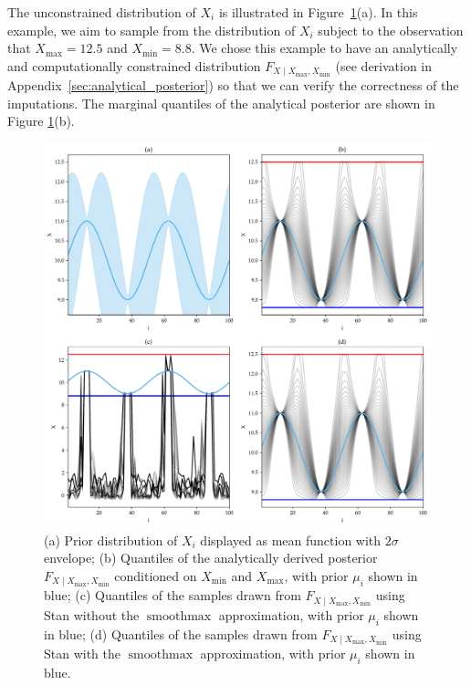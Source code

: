 \documentclass[letter]{article}
\makeatletter
\def\maxwidth{\ifdim\Gin@nat@width>\linewidth\linewidth
\else\Gin@nat@width\fi}
\let\Oldincludegraphics\includegraphics
\renewcommand{\includegraphics}[1]{\Oldincludegraphics[width=0.98\maxwidth]{#1}}
\DeclareMathOperator*{\softmax}{smoothmax}
\newcommand{\Xmax}{X_{\max}}
\newcommand{\Xmin}{X_{\min}}
\newcommand{\Fcond}{F_{X \mid \Xmax,\Xmin}}
\makeatother
\begin{document}
The unconstrained distribution of \(X_i\) is illustrated in Figure~\ref{fig:toy_quantiles}(a).
In this example, we aim to sample from the distribution of \(X_i\) subject to the observation that \(\Xmax=12.5\) and \(\Xmin=8.8\).
We chose this example to have an analytically and computationally constrained distribution \(\Fcond\) (see derivation in Appendix~\ref{sec:analytical_posterior}) so that we can verify the correctness of the imputations.
The marginal quantiles of the analytical posterior are shown in Figure \ref{fig:toy_quantiles}(b).
    


        \begin{figure}
\centering
\includegraphics{../figures/toy_quantiles.png}
\caption{\label{fig:toy_quantiles}(a) Prior distribution of \(X_i\) displayed as mean function with \(2\sigma\) envelope; (b) Quantiles of the analytically derived posterior \(\Fcond\) conditioned on \(\Xmin\) and \(\Xmax\), with prior \(\mu_i\) shown in blue; (c) Quantiles of the samples drawn from \(\Fcond\) using Stan without the \(\softmax\) approximation, with prior \(\mu_i\) shown in blue; (d) Quantiles of the samples drawn from \(\Fcond\) using Stan with the \(\softmax\) approximation, with prior \(\mu_i\) shown in blue.}
\end{figure}
\end{document}
